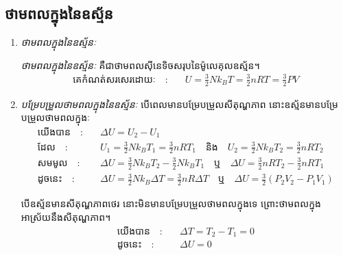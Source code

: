 \subsection{ថាមពលក្នុងនៃឧស្ម័ន}
\begin{enumerate}[k]
	\item \emph{\kml ថាមពលក្នុងនៃឧស្ម័នៈ}
	\begin{definition}
		\emph{ថាមពលក្នុងនៃឧស្ម័នៈ} គឺជាថាមពលសុីនេទិចសរុបនៃម៉ូលេគុលឧស្ម័ន។
		\begin{align*}
			\text{គេកំណត់សរសេរដោយៈ}\quad :&\quad U=\frac{3}{2}Nk_{B}T=\frac{3}{2}nRT=\frac{3}{2}PV
		\end{align*}
	\end{definition}
	\item \emph{\kml បម្រែបម្រួលថាមពលក្នុងនៃឧស្ម័នៈ} បើពេលមានបម្រែបម្រួលសីតុណ្ហភាព នោះឧស្ម័នមានបម្រែបម្រួលថាមពលក្នុងៈ 
	\begin{align*}
		\text{យើងបាន}\quad :&\quad \Delta U= U_{2}-U_1\\
		\text{ដែល}\quad :&\quad U_1=\frac{3}{2}Nk_{B}T_{1}=\frac{3}{2}nRT_{1}\quad \text{និង}\quad U_{2}=\frac{3}{2}Nk_{B}T_{2}=\frac{3}{2}nRT_{2}\\
		\text{សមមូល}\quad :&\quad \Delta U=\frac{3}{2}Nk_{B}T_{2}-\frac{3}{2}Nk_{B}T_{1}\quad\text{ឬ}\quad \Delta U=\frac{3}{2}nRT_{2}-\frac{3}{2}nRT_{1}\\
		\text{ដូចនេះ}\quad :&\quad \Delta U=\frac{3}{2}Nk_{B}\Delta T=\frac{3}{2}nR\Delta T\quad \text{ឬ}\quad \Delta U=\frac{3}{2}\left(P_{2}V_{2}-P_{1}V_{1}\right)
	\end{align*}
	\begin{remark}
		បើឧស្ម័នមានសីតុណ្ហភាពថេរ នោះមិនមានបម្រែបម្រួលថាមពលក្នុងទេ ព្រោះថាមពលក្នុងអាស្រ័យនឹងសីតុណ្ហភាព។
		\begin{align*}
			\text{យើងបាន}\quad :&\quad \Delta T=T_2-T_1=0\\
			\text{ដូចនេះ}\quad :&\quad \Delta U=0
		\end{align*}
	\end{remark}
\end{enumerate}
